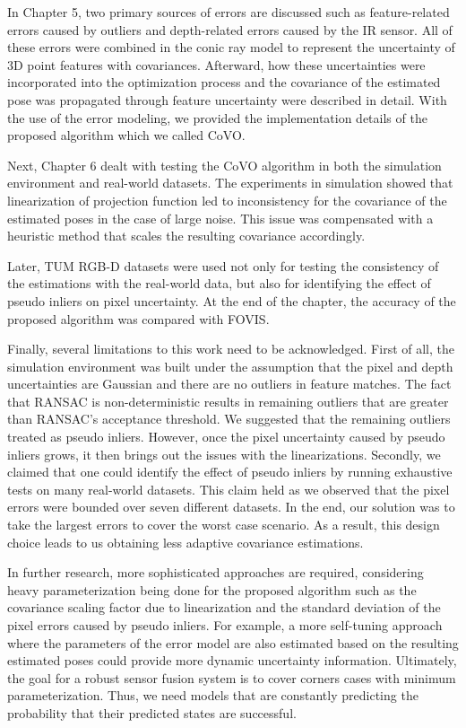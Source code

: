 \documentclass[a4paper]{report}
\numberwithin{figure}{section}
\begin{document}
In Chapter 5, two primary sources of errors are discussed such as
feature-related errors caused by outliers and depth-related errors caused by
the IR sensor.  All of these errors were combined in the conic ray model to
represent the uncertainty of 3D point features with covariances.
Afterward, how these uncertainties were incorporated into the optimization
process and the covariance of the estimated pose was propagated through feature
uncertainty were described in detail. With the use of the error modeling, we
provided the implementation details of the proposed algorithm which we called
CoVO.

Next, Chapter 6 dealt with testing the CoVO algorithm in both the simulation
environment and real-world datasets. 
The experiments in simulation showed that linearization of projection function
led to inconsistency for the covariance of the estimated poses in the case of
large noise.  This issue was compensated with a heuristic method that scales
the resulting covariance accordingly.

Later, TUM RGB-D datasets were used not only for testing the consistency of the
estimations with the real-world data, but also for identifying the effect of
pseudo inliers on pixel uncertainty. 
At the end of the chapter, the accuracy of the proposed algorithm was compared
with FOVIS.

Finally, several limitations to this work need to be acknowledged.  First of
all, the simulation environment was built under the assumption that the pixel
and depth uncertainties are Gaussian and there are no outliers in feature
matches. The fact that RANSAC is non-deterministic results in remaining
outliers that are greater than RANSAC's acceptance threshold. We suggested that
the remaining outliers treated as pseudo inliers.  However, once the pixel
uncertainty caused by pseudo inliers grows, it then brings out the issues with
the linearizations.  Secondly, we claimed that 
one could identify the effect of pseudo inliers by running exhaustive tests on 
many real-world datasets. 
This claim held as we observed that the pixel errors were bounded 
over seven different datasets. In the end, our solution was to take the largest
errors to cover the worst case scenario.  As a result, this design choice 
leads to us obtaining less 
adaptive covariance estimations. 

In further research, more sophisticated approaches are required, considering
heavy parameterization being done for the proposed algorithm such as the covariance
scaling factor due to linearization and the standard deviation of the
pixel errors caused by pseudo inliers. For example, a more self-tuning approach
where the parameters of the error model are also estimated based on the
resulting estimated poses could provide more dynamic uncertainty information.
Ultimately, the goal for a robust sensor fusion system is to cover
corners cases with minimum parameterization.  Thus, we need models that are
constantly predicting the probability that their predicted states are
successful.
\end{document}
